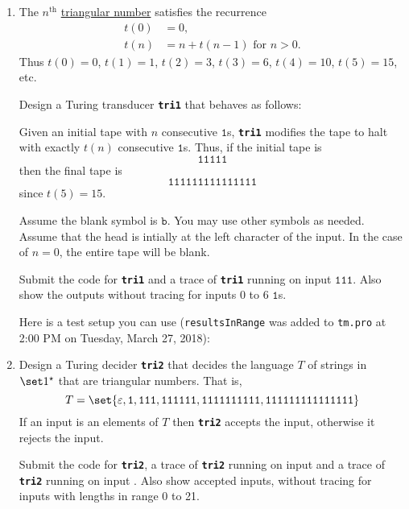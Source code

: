 \documentclass{cs81-homework}
\begin{document}
\begin{enumerate}
\item {} The \(n^\text{th}\) \underline{triangular number} satisfies
  the recurrence
  \begin{align*}
    t(0) &= 0, \\
    t(n) &= n + t(n-1) \text{ for } n > 0.
  \end{align*}
  Thus \(t(0) = 0\), \(t(1) = 1\), \(t(2) = 3\), \(t(3) = 6\), \(t(4) = 10\),
  \(t(5) = 15\), etc.

  Design a Turing transducer \textbf{\texttt{tri1}} that behaves as follows:

  Given an initial tape with \(n\) consecutive \(\mathtt 1\)s,
  \textbf{\texttt{tri1}} modifies the tape to halt with exactly \(t(n)\)
  consecutive \(\mathtt 1\)s.  Thus, if the initial tape is
  \[
    \mathtt{11111}
  \]
  then the final tape is
  \[
    \mathtt{111111111111111}
  \]
  since \(t(5) = 15\).

  Assume the blank symbol is \(\mathtt b\).  You may use other symbols as
  needed.  Assume that the head is intially at the left character of the input.
  In the case of \(n=0\), the entire tape will be blank.

  Submit the code for \textbf{\texttt{tri1}} and a trace of
  \textbf{\texttt{tri1}} running on input \(\mathtt{111}\).  Also show the
  outputs without tracing for inputs 0 to 6 \(\mathtt 1\)s.

  Here is a test setup you can use (\texttt{resultsInRange} was added to
  \texttt{tm.pro} at 2:00 PM on Tuesday, March 27, 2018):
  
  

  \begin{solution}
  \end{solution}

\item {} Design a Turing decider \textbf{\texttt{tri2}} that decides
  the language \(T\) of strings in \(\set 1^\star\) that are triangular numbers.
  That is,
  \[
    T =\set{\varepsilon, \mathtt 1, \mathtt{111}, \mathtt{111111},
      \mathtt{1111111111}, \mathtt{111111111111111}}
  \]
  If an input is an elements of \(T\) then \textbf{\texttt{tri2}} accepts the
  input, otherwise it rejects the input.

  Submit the code for \textbf{\texttt{tri2}}, a trace of
  \textbf{\texttt{tri2}} running on input and a trace of
  \textbf{\texttt{tri2}} running on input .  Also show accepted inputs,
  without tracing for inputs with lengths in range 0 to 21.


\end{enumerate}
\end{document}
